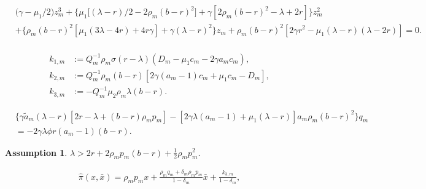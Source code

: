 \documentclass[10pt,a4paper]{amsart}
\newtheorem{assumption}{Assumption}
\begin{document}
	\begin{align}	
		&\big(\gamma-\mu_{1}/2\big){z^3_{\scriptscriptstyle m}}+\big\{\mu_{1}\big[ (\lambda-r)/2-2\rho_{\scriptscriptstyle m}(b-r)^2\big]+\gamma[2\rho_{\scriptscriptstyle m}(b-r)^2-\lambda+2r]\big\}{z^2_{\scriptscriptstyle m}}\\
		&+\{\rho_{\scriptscriptstyle m}(b-r)^2[\mu_{1}(3\lambda-4r)+4r\gamma]+\gamma(\lambda-r)^2\}z_{\scriptscriptstyle m}+\rho_{\scriptscriptstyle m}(b-r)^2[2\gamma r^2-\mu_{1}(\lambda-r)(\lambda-2r)]=0.\\\label{eq:MF-p1}
	\end{align}	

	\begin{align}
		k_{1,\scriptscriptstyle m}&:={Q^{-1}_{\scriptscriptstyle m}}\rho_{\scriptscriptstyle m}\sigma(r-\lambda)(D_{\scriptscriptstyle m}-\mu_{1}c_{\scriptscriptstyle m}-2\gamma a_{\scriptscriptstyle m}c_{\scriptscriptstyle m}),\label{eq:MFk1}\\	
		k_{2,\scriptscriptstyle m}&:={Q^{-1}_{\scriptscriptstyle m}}\rho_{\scriptscriptstyle m} (b -r)[2\gamma (a_{\scriptscriptstyle m} -1)c_{\scriptscriptstyle m} +\mu_{1}c_{\scriptscriptstyle m} -D_{\scriptscriptstyle m} ],\label{eq:MFk2}\\
		k_{3,\scriptscriptstyle m}&:=-{Q^{-1}_{\scriptscriptstyle m}}\mu_{2}\rho_{\scriptscriptstyle m} \lambda(b -r).\label{eq:MFk3}
	\end{align}

	\begin{align}
		&\{\gamma \tilde{a}_{\scriptscriptstyle m}(\lambda-r)[2r-\lambda+(b-r)\rho_{\scriptscriptstyle m} p_{\scriptscriptstyle m}]-[2\gamma\lambda(a_{\scriptscriptstyle m}-1)+\mu_1(\lambda-r)]a_{\scriptscriptstyle m}\rho_{\scriptscriptstyle m}(b-r)^2\}q_{\scriptscriptstyle m}\\
		&=-2\gamma\lambda\phi r(a_{\scriptscriptstyle m}-1)(b-r).\label{eq:MFq2}
	\end{align}

\begin{assumption}\label{assum:mf}
		$\lambda >
		2r+2\rho_{\scriptscriptstyle m} p_{\scriptscriptstyle m}(b-r)+\tfrac{1}{2}\rho_{\scriptscriptstyle m} p_{\scriptscriptstyle m}^2$.
	\end{assumption}

\begin{align}\label{eq:M-Hpifinal}
\widehat{\pi}(x,\bar{x}) =\rho_{\scriptscriptstyle m} p_{\scriptscriptstyle m} x+\frac{\rho_{\scriptscriptstyle m}q_{\scriptscriptstyle m}+\delta_{\scriptscriptstyle m}\rho_{\scriptscriptstyle m} p_{\scriptscriptstyle m}}{1-\delta_{\scriptscriptstyle m}}\bar{x}+\frac{k_{3,m}}{1-\delta_{\scriptscriptstyle m}},
\end{align}
\end{document}

